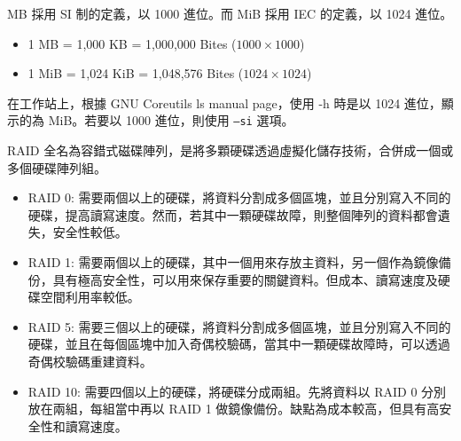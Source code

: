 \documentclass[12pt]{article}
\newenvironment{problem}[2][Problem]{\begin{trivlist}
\item[\hskip \labelsep {\bfseries #1}\hskip \labelsep {\bfseries #2}]}{\end{trivlist}}
\begin{document}
\begin{problem}{8.4} MB 採用 SI 制的定義，以 1000 進位。而 MiB 採用 IEC 的定義，以 1024 進位。
  \begin{itemize}
    \item 1 MB  = 1,000 KB  = 1,000,000 Bites ($1000 \times 1000$)
      \vspace{-0.3cm}
    \item 1 MiB = 1,024 KiB = 1,048,576 Bites ($1024 \times 1024$)
  \end{itemize}
  在工作站上，根據 GNU Coreutils ls manual page，使用 -h 時是以 1024 進位，顯示的為 MiB。若要以 1000 進位，則使用 \texttt{--si} 選項。
\end{problem}

\begin{problem}{8.5}

  RAID 全名為容錯式磁碟陣列，是將多顆硬碟透過虛擬化儲存技術，合併成一個或多個硬碟陣列組。
  \begin{itemize}
    \item RAID 0: 需要兩個以上的硬碟，將資料分割成多個區塊，並且分別寫入不同的硬碟，提高讀寫速度。然而，若其中一顆硬碟故障，則整個陣列的資料都會遺失，安全性較低。
    \item RAID 1: 需要兩個以上的硬碟，其中一個用來存放主資料，另一個作為鏡像備份，具有極高安全性，可以用來保存重要的關鍵資料。但成本、讀寫速度及硬碟空間利用率較低。
    \item RAID 5: 需要三個以上的硬碟，將資料分割成多個區塊，並且分別寫入不同的硬碟，並且在每個區塊中加入奇偶校驗碼，當其中一顆硬碟故障時，可以透過奇偶校驗碼重建資料。
    \item RAID 10: 需要四個以上的硬碟，將硬碟分成兩組。先將資料以 RAID 0 分別放在兩組，每組當中再以 RAID 1 做鏡像備份。缺點為成本較高，但具有高安全性和讀寫速度。
  \end{itemize}
\end{problem}

\end{document}
